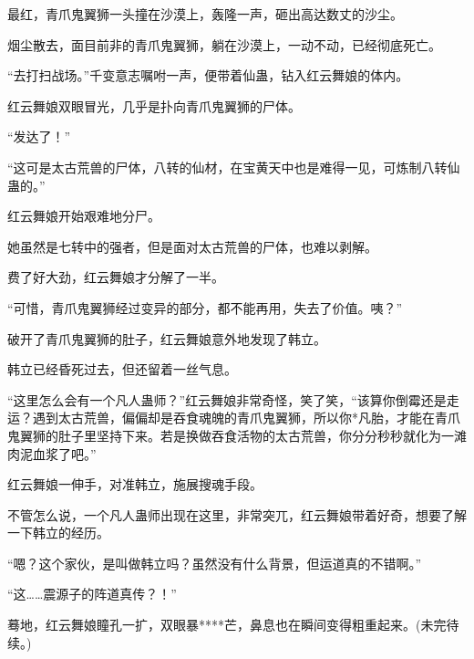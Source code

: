 \begin{this_body}
最红，青爪鬼翼狮一头撞在沙漠上，轰隆一声，砸出高达数丈的沙尘。

烟尘散去，面目前非的青爪鬼翼狮，躺在沙漠上，一动不动，已经彻底死亡。

“去打扫战场。”千变意志嘱咐一声，便带着仙蛊，钻入红云舞娘的体内。

红云舞娘双眼冒光，几乎是扑向青爪鬼翼狮的尸体。

“发达了！”

“这可是太古荒兽的尸体，八转的仙材，在宝黄天中也是难得一见，可炼制八转仙蛊的。”

红云舞娘开始艰难地分尸。

她虽然是七转中的强者，但是面对太古荒兽的尸体，也难以剥解。

费了好大劲，红云舞娘才分解了一半。

“可惜，青爪鬼翼狮经过变异的部分，都不能再用，失去了价值。咦？”

破开了青爪鬼翼狮的肚子，红云舞娘意外地发现了韩立。

韩立已经昏死过去，但还留着一丝气息。

“这里怎么会有一个凡人蛊师？”红云舞娘非常奇怪，笑了笑，“该算你倒霉还是走运？遇到太古荒兽，偏偏却是吞食魂魄的青爪鬼翼狮，所以你*凡胎，才能在青爪鬼翼狮的肚子里坚持下来。若是换做吞食活物的太古荒兽，你分分秒秒就化为一滩肉泥血浆了吧。”

红云舞娘一伸手，对准韩立，施展搜魂手段。

不管怎么说，一个凡人蛊师出现在这里，非常突兀，红云舞娘带着好奇，想要了解一下韩立的经历。

“嗯？这个家伙，是叫做韩立吗？虽然没有什么背景，但运道真的不错啊。”

“这……震源子的阵道真传？！”

蓦地，红云舞娘瞳孔一扩，双眼暴****芒，鼻息也在瞬间变得粗重起来。(未完待续。)

\end{this_body}

